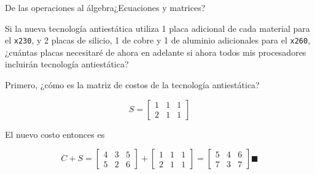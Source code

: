 \documentclass[spanish, c]{beamer}
\begin{document}
\begin{frame}{De las operaciones al álgebra}{¿Ecuaciones y matrices?}

    Si la nueva tecnología antiestática utiliza 1 placa adicional de cada material para el \texttt{x230}, y 2 placas de silicio, 1 de cobre y 1 de aluminio adicionales para el \texttt{x260}, ¿cuántas placas necesitaré de ahora en adelante si ahora todos mis procesadores incluirán tecnología antiestática?

    \bigskip \pause

    Primero, ¿cómo es la matriz de costos de la tecnología antiestática? \pause
    
    $$S = \begin{bmatrix*}
        1 & 1 & 1 \\
        2 & 1 & 1
    \end{bmatrix*}$$

    \bigskip \pause

    El nuevo costo entonces es \bigskip

    \[%
        C + S =%
        \begin{bmatrix*}
            4 & 3 & 5 \\
            5 & 2 & 6
        \end{bmatrix*}
        +
        \begin{bmatrix*}
            1 & 1 & 1 \\
            2 & 1 & 1
        \end{bmatrix*}
        =
        \begin{bmatrix*}
            5 & 4 & 6 \\
            7 & 3 & 7
        \end{bmatrix*} \blacksquare
    \]
\end{frame}
\end{document}
